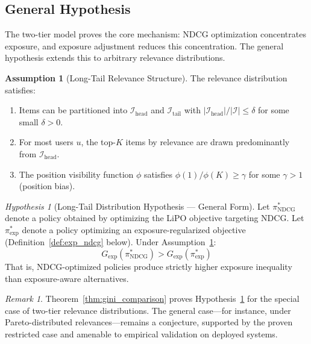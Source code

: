 \documentclass[11pt,a4paper]{article}
\theoremstyle{definition}
\newtheorem{assumption}{Assumption}[section]
\theoremstyle{plain}
\theoremstyle{remark}
\newtheorem{hypothesis}{Hypothesis}
\newtheorem{remark}{Remark}[section]
\newcommand{\NDCG}{\mathrm{NDCG}}
\begin{document}
\subsection{General Hypothesis}
\label{subsec:h1_statement}

The two-tier model proves the core mechanism: NDCG optimization concentrates exposure, and exposure adjustment reduces this concentration. The general hypothesis extends this to arbitrary relevance distributions.

\begin{assumption}[Long-Tail Relevance Structure]
\label{assump:longtail}
The relevance distribution satisfies:
\begin{enumerate}[label=(\alph*)]
    \item Items can be partitioned into $\mathcal{I}_{\text{head}}$ and $\mathcal{I}_{\text{tail}}$ with $|\mathcal{I}_{\text{head}}| / |\mathcal{I}| \leq \delta$ for some small $\delta > 0$.
    \item For most users $u$, the top-$K$ items by relevance are drawn predominantly from $\mathcal{I}_{\text{head}}$.
    \item The position visibility function $\phi$ satisfies $\phi(1) / \phi(K) \geq \gamma$ for some $\gamma > 1$ (position bias).
\end{enumerate}
\end{assumption}

\begin{hypothesis}[Long-Tail Distribution Hypothesis --- General Form]
\label{hyp:longtail}
Let $\pi^*_{\NDCG}$ denote a policy obtained by optimizing the LiPO objective targeting NDCG. Let $\pi^*_{\text{exp}}$ denote a policy optimizing an exposure-regularized objective (Definition~\ref{def:exp_ndcg} below). Under Assumption~\ref{assump:longtail}:
\begin{equation}
    G_{\text{exp}}(\pi^*_{\NDCG}) > G_{\text{exp}}(\pi^*_{\text{exp}})
\end{equation}
That is, NDCG-optimized policies produce strictly higher exposure inequality than exposure-aware alternatives.
\end{hypothesis}

\begin{remark}
Theorem~\ref{thm:gini_comparison} proves Hypothesis~\ref{hyp:longtail} for the special case of two-tier relevance distributions. The general case---for instance, under Pareto-distributed relevances---remains a conjecture, supported by the proven restricted case and amenable to empirical validation on deployed systems.
\end{remark}
\end{document}
